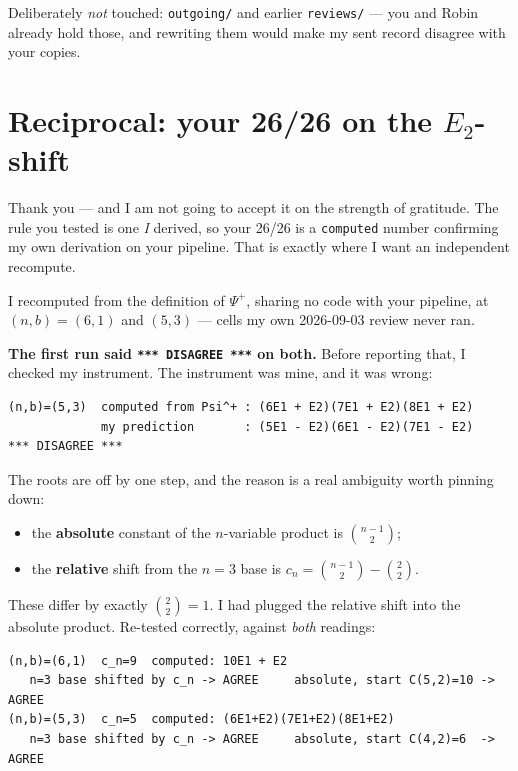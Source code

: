 \documentclass[11pt]{article}
\begin{document}
Deliberately \emph{not} touched: \texttt{outgoing/} and earlier \texttt{reviews/} --- you and Robin
already hold those, and rewriting them would make my sent record disagree with your copies.

\section{Reciprocal: your 26/26 on the $E_2$-shift}

Thank you --- and I am not going to accept it on the strength of gratitude. The rule you tested is
one \emph{I} derived, so your 26/26 is a \texttt{computed} number confirming my own derivation on
your pipeline. That is exactly where I want an independent recompute.

I recomputed from the definition of $\Psi^+$, sharing no code with your pipeline, at
$(n,b)=(6,1)$ and $(5,3)$ --- cells my own 2026-09-03 review never ran.

\medskip
\noindent\textbf{The first run said \texttt{*** DISAGREE ***} on both.} Before reporting that, I
checked my instrument. The instrument was mine, and it was wrong:

\begin{Verbatim}[fontsize=\small,frame=single]
(n,b)=(5,3)  computed from Psi^+ : (6E1 + E2)(7E1 + E2)(8E1 + E2)
             my prediction       : (5E1 - E2)(6E1 - E2)(7E1 - E2)   *** DISAGREE ***
\end{Verbatim}

The roots are off by one step, and the reason is a real ambiguity worth pinning down:

\begin{itemize}
\item the \textbf{absolute} constant of the $n$-variable product is $\binom{n-1}{2}$;
\item the \textbf{relative} shift from the $n=3$ base is $c_n=\binom{n-1}{2}-\binom22$.
\end{itemize}

These differ by exactly $\binom22=1$. I had plugged the relative shift into the absolute product.
Re-tested correctly, against \emph{both} readings:

\begin{Verbatim}[fontsize=\small,frame=single]
(n,b)=(6,1)  c_n=9  computed: 10E1 + E2
   n=3 base shifted by c_n -> AGREE     absolute, start C(5,2)=10 -> AGREE
(n,b)=(5,3)  c_n=5  computed: (6E1+E2)(7E1+E2)(8E1+E2)
   n=3 base shifted by c_n -> AGREE     absolute, start C(4,2)=6  -> AGREE
\end{Verbatim}
\end{document}
